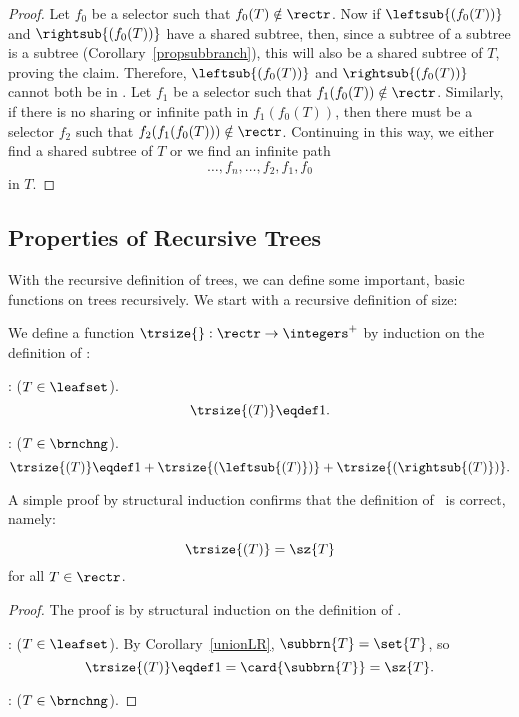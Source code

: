 \begin{definition}
\begin{proof}
Let $f_0$ be a selector such that $f_0(T) \notin \rectr$.  Now if
$\leftsub{(f_0(T))}$ and $\rightsub{(f_0(T))}$ have a shared subtree,
then, since a subtree of a subtree is a subtree
(Corollary~\ref{propsubbranch}), this will also be a shared subtree of
$T$, proving the claim.  Therefore, $\leftsub{(f_0(T))}$ and
$\rightsub{(f_0(T))}$ cannot both be in \rectr.  Let $f_1$ be a
selector such that $f_1(f_0(T)) \notin \rectr$.  Similarly, if there
is no sharing or infinite path in $f_1(f_0(T))$, then there must be a
selector $f_2$ such that $f_2(f_1(f_0(T))) \notin \rectr$.  Continuing
in this way, we either find a shared subtree of $T$ or we find an
infinite path
\[
\dots,f_n,\dots, f_2,f_1,f_0
\]
in $T$.
\end{proof}

\subsection{Properties of Recursive Trees}
With the recursive definition of trees, we can define some important,
basic functions on trees recursively.  We start with a recursive
definition of size:
\begin{definition}
We define a function $\trsize{}: \rectr \to \integers^+$ by induction on
the definition of \rectr:

: ($T \in \leafset$).
\[
\trsize{(T)} \eqdef 1.
\]

: ($T \in \brnchng$).
\[
\trsize{(T)} \eqdef 1 + \trsize{(\leftsub{(T)})} + \trsize{(\rightsub{(T)})}.
\]
\end{definition}

A simple proof by structural induction confirms that the definition of
\trsize{}\ is correct, namely:
\begin{lemma}\label{}
\[
\trsize{(T)} = \sz{T}
\]
for all $T \in \rectr$.

\begin{proof}
The proof is by structural induction on the definition of \rectr.

: ($T \in \leafset$).
By Corollary~\ref{unionLR}, $\subbrn{T} = \set{T}$, so
\[
\trsize{(T)} \eqdef 1 = \card{\subbrn{T}} = \sz{T}.
\]

: ($T \in\brnchng$).


\end{proof}
\end{lemma}
\end{definition}
